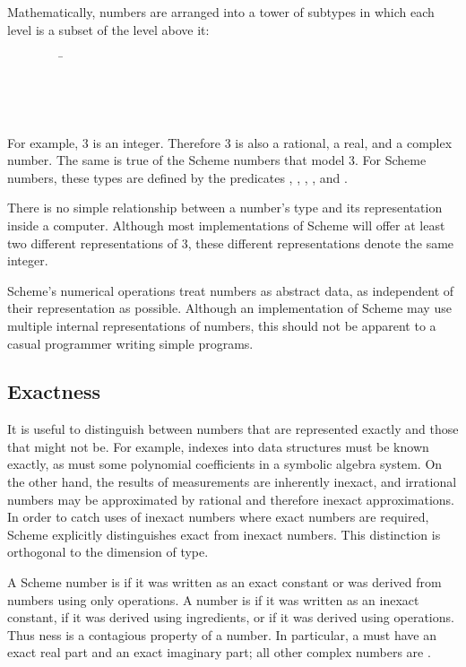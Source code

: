 \vest Mathematically, numbers are arranged into a tower of subtypes
in which each level is a subset of the level above it:
\begin{tabbing}
\ \ \ \ \ \ \ \ \ \= \\
\>  \\
\>  \\
\>  \\
\>  
\end{tabbing}

For example, 3 is an integer.  Therefore 3 is also a rational,
a real, and a complex number.  The same is true of the Scheme numbers
that model 3.  For Scheme numbers, these types are defined by the
predicates , , , ,
and .

There is no simple relationship between a number's type and its
representation inside a computer.  Although most implementations of
Scheme will offer at least two different representations of 3, these
different representations denote the same integer.

Scheme's numerical operations treat numbers as abstract data, as
independent of their representation as possible.  Although an implementation
of Scheme may use multiple internal representations of
numbers, this should not be apparent to a casual programmer writing
simple programs.

\subsection{Exactness}

 \label{exactly}

It is useful to distinguish between numbers that are
represented exactly and those that might not be.  For example, indexes
into data structures must be known exactly, as must some polynomial
coefficients in a symbolic algebra system.  On the other hand, the
results of measurements are inherently inexact, and irrational numbers
may be approximated by rational and therefore inexact approximations.
In order to catch uses of inexact numbers where exact numbers are
required, Scheme explicitly distinguishes exact from inexact numbers.
This distinction is orthogonal to the dimension of type.

A Scheme number is
 if it was written as an exact constant or was derived from
 numbers using only  operations.  A number is
 if it was written as an inexact constant,
if it was
derived using  ingredients, or if it was derived using
 operations. Thus ness is a contagious
property of a number.
In particular, a  must have an exact real part
and an exact imaginary part; all other complex numbers are .

